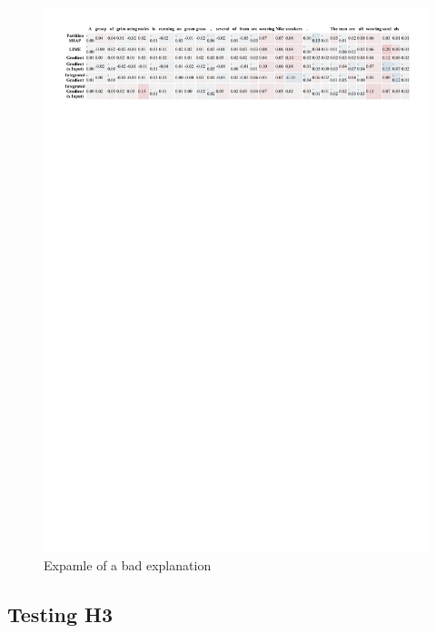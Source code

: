 \begin{figure}[h!]
    \centering
    \includegraphics[width=\textwidth]{./images/ferret_sample.pdf}
    \caption{Expamle of a bad explanation}
    \label{fig:ferret-sample}
\end{figure}

\subsection{Testing H3}

